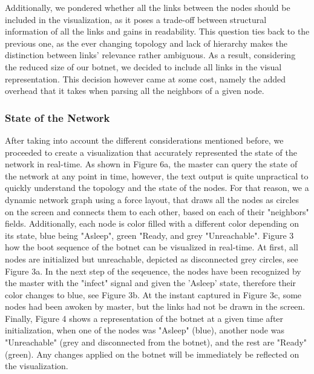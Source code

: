 \documentclass{proc}
\begin{document}
Additionally, we pondered whether all the links between the nodes should be included in the visualization, as it poses a trade-off between structural information of all the links and gains in readability. This question ties back to the previous one, as the ever changing topology and lack of hierarchy makes the distinction between links' relevance rather ambiguous. As a result, considering the reduced size of our botnet, we decided to include all links in the visual representation. This decision however came at some cost, namely the added overhead that it takes when parsing all the neighbors of a given node. 

\subsubsection{State of the Network}
After taking into account the different considerations mentioned before, we proceeded to create a visualization that accurately represented the state of the network in real-time. As shown in Figure 6a, the master can query the state of the network at any point in time, however, the text output is quite unpractical to quickly understand the topology and the state of the nodes. For that reason, we a dynamic network graph using a force layout, that draws all the nodes as circles on the screen and connects them to each other, based on each of their "neighbors" fields. Additionally, each node is color filled with a different color depending on its state, blue being "Asleep", green "Ready, and grey "Unreachable". Figure 3 how the boot sequence of the botnet can be visualized in real-time. At first, all nodes are initialized but unreachable, depicted as disconnected grey circles, see Figure 3a. In the next step of the seqeuence, the nodes have been recognized by the master with the "infect" signal and given the 'Asleep' state, therefore their color changes to blue, see Figure 3b. At the instant captured in Figure 3c, some nodes had been awoken by master, but the links had not be drawn in the screen. Finally, Figure 4 shows a representation of the botnet at a given time after initialization, when one of the nodes was "Asleep" (blue), another node was "Unreachable" (grey and disconnected from the botnet), and the rest are "Ready"(green). Any changes applied on the botnet will be immediately be reflected on the visualization.
\end{document}
